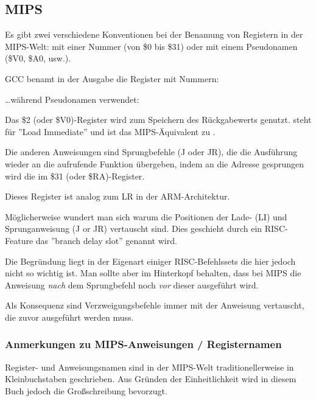\subsection{MIPS}

\label{MIPS_leaf_function_ex1}
Es gibt zwei verschiedene Konventionen bei der Benamung von Registern in der MIPS-Welt:
mit einer Nummer (von \$0 bis \$31) oder mit einem Pseudonamen (\$V0, \$A0, usw.).

GCC benamt in der Ausgabe die Register mit Nummern:



\dots während \IDA Pseudonamen verwendet:



Das \$2 (oder \$V0)-Register wird zum Speichern des Rückgabewerts genutzt.
 steht für ''Load Immediate'' und ist das MIPS-Äquivalent zu \MOV.

Die anderen Anweisungen sind Sprungbefehle (J oder JR), die die Ausführung wieder an die aufrufende Funktion übergeben,
indem an die Adresse gesprungen wird die im \$31 (oder \$RA)-Register.

Dieses Register ist analog zum \ac{LR} in der ARM-Architektur.

Möglicherweise wundert man sich warum die Positionen der Lade- (LI) und Sprunganweisung (J or JR) vertauscht sind.
Dies geschieht durch ein \ac{RISC}-Feature das ''branch delay slot'' genannt wird.

Die Begründung liegt in der Eigenart einiger RISC-Befehlssets die hier jedoch nicht so wichtig ist. Man sollte
aber im Hinterkopf behalten, dass bei MIPS die Anweisung \emph{nach} dem Sprungbefehl noch \emph{vor} dieser ausgeführt wird.

Als Konsequenz sind Verzweigungsbefehle immer mit der Anweisung vertauscht, die zuvor ausgeführt werden muss.

\subsubsection{Anmerkungen zu MIPS-Anweisungen / Registernamen}

Register- und Anweisungsnamen sind in der MIPS-Welt traditionellerweise in Kleinbuchstaben geschrieben.
Aus Gründen der Einheitlichkeit wird in diesem Buch jedoch die Großschreibung bevorzugt.


